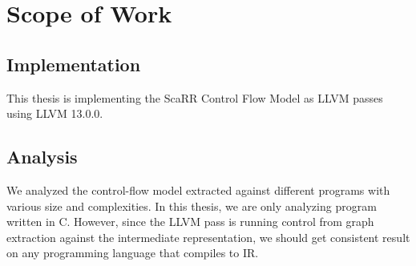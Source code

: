 
\chapter{Scope of Work} %

\label{Chapter3} %

\section{Implementation}
This thesis is implementing the ScaRR Control Flow Model as LLVM passes using LLVM 13.0.0. 

\section{Analysis}

We analyzed the control-flow model extracted against different programs with various size and complexities. In this thesis, we are only analyzing program written in C. However, since the LLVM pass is running control from graph extraction against the intermediate representation, we should get consistent result on any programming language that compiles to IR.
